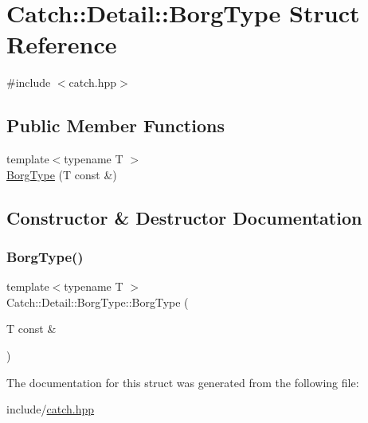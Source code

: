 \hypertarget{struct_catch_1_1_detail_1_1_borg_type}{}\section{Catch\+:\+:Detail\+:\+:Borg\+Type Struct Reference}
\label{struct_catch_1_1_detail_1_1_borg_type}


{\ttfamily \#include $<$catch.\+hpp$>$}

\subsection*{Public Member Functions}
\begin{DoxyCompactItemize}
\item 
{\footnotesize template$<$typename T $>$ }\\\mbox{\hyperlink{struct_catch_1_1_detail_1_1_borg_type_a780a9946ed0d654f0bfc043c8fc505d8}{Borg\+Type}} (T const \&)
\end{DoxyCompactItemize}


\subsection{Constructor \& Destructor Documentation}
\mbox{\label{struct_catch_1_1_detail_1_1_borg_type_a780a9946ed0d654f0bfc043c8fc505d8}} 
\subsubsection{\texorpdfstring{Borg\+Type()}{BorgType()}}
{\footnotesize\ttfamily template$<$typename T $>$ \\
Catch\+::\+Detail\+::\+Borg\+Type\+::\+Borg\+Type (\begin{DoxyParamCaption}\item[{T const \&}]{ }\end{DoxyParamCaption})}



The documentation for this struct was generated from the following file\+:\begin{DoxyCompactItemize}
\item 
include/\mbox{\hyperlink{catch_8hpp}{catch.\+hpp}}\end{DoxyCompactItemize}
